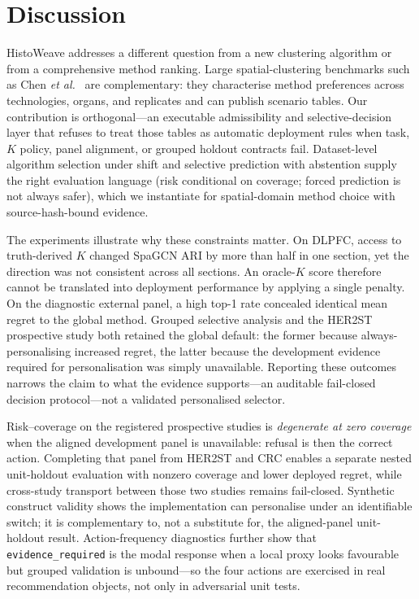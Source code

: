 \documentclass[12pt]{article}
\newcommand{\software}{HistoWeave}
\begin{document}
\section{Discussion}

\software{} addresses a different question from a new clustering algorithm or
from a comprehensive method ranking. Large spatial-clustering benchmarks such
as Chen \textit{et al.}\ \citep{chen2025imeta} are complementary: they
characterise method preferences across technologies, organs, and replicates and
can publish scenario tables. Our contribution is orthogonal---an executable
admissibility and selective-decision layer that refuses to treat those tables
as automatic deployment rules when task, \(K\) policy, panel alignment, or
grouped holdout contracts fail. Dataset-level algorithm selection under shift
\citep{jiang2025ood} and selective prediction with abstention
\citep{geifman2017selective,casacuberta2025selective} supply the right
evaluation language (risk conditional on coverage; forced prediction is not
always safer), which we instantiate for spatial-domain method choice with
source-hash-bound evidence.

The experiments illustrate why these constraints matter. On DLPFC, access to
truth-derived \(K\) changed SpaGCN ARI by more than half in one section, yet
the direction was not consistent across all sections. An oracle-\(K\) score
therefore cannot be translated into deployment performance by applying a
single penalty. On the diagnostic external panel, a high top-1 rate concealed
identical mean regret to the global method. Grouped selective analysis and the
HER2ST prospective study both retained the global default: the former because
always-personalising increased regret, the latter because the development
evidence required for personalisation was simply unavailable. Reporting these
outcomes narrows the claim to what the evidence supports---an auditable
fail-closed decision protocol---not a validated personalised selector.

Risk--coverage on the registered prospective studies is \emph{degenerate at
zero coverage} when the aligned development panel is unavailable: refusal is
then the correct action. Completing that panel from HER2ST and CRC enables a
separate nested unit-holdout evaluation with nonzero coverage and lower
deployed regret, while cross-study transport between those two studies remains
fail-closed. Synthetic construct validity shows the implementation can
personalise under an identifiable switch; it is complementary to, not a
substitute for, the aligned-panel unit-holdout result. Action-frequency
diagnostics further show that \texttt{evidence\_required} is the modal
response when a local proxy looks favourable but grouped validation is
unbound---so the four actions are exercised in real recommendation objects,
not only in adversarial unit tests.
\end{document}
